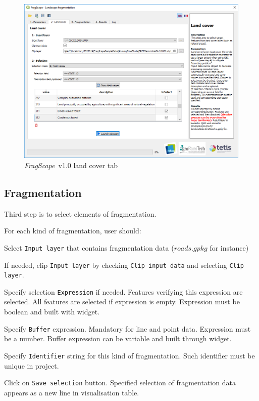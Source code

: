 \documentclass[11pt]{article}
\newcommand{\source}[1]{\vspace*{-0.4cm}\caption*{\textit{Source: {#1}}}}
\newcommand{\tool}{\emph{FragScape}}
\let\tempone\itemize
\let\temptwo\enditemize
\renewenvironment{enumerate}{\tempone\addtolength{\itemsep}{-0.5\baselineskip}}{\temptwo}
\begin{document}
\begin{figure}[h!]
    \centering
    \includegraphics[scale=0.7]{pictures/landuseTabEn.png}
    \caption{\tool\ v1.0 land cover tab}
    \label{fig:landuseTab}
\end{figure}

\subsection{Fragmentation}

Third step is to select elements of fragmentation.

For each kind of fragmentation, user should:
\begin{enumerate}
    \item Select \texttt{Input layer} that contains fragmentation data ($roads.gpkg$ for instance)
    \item If needed, clip \texttt{Input layer} by checking \texttt{Clip input data} and selecting \texttt{Clip layer}.
    \item Specify selection \texttt{Expression} if needed. Features verifying this expression are selected. All features are selected if expression is empty. Expression must be boolean and built with  widget.
    \item Specify \texttt{Buffer} expression. Mandatory for line and point data. Expression must be a number. Buffer expression can be variable and built through  widget.
    \item Specify \texttt{Identifier} string for this kind of fragmentation. Such identifier must be unique in project.
    \item Click on \texttt{Save selection} button. Specified selection of fragmentation data appears as a new line in visualisation table.
\end{enumerate}
\end{document}

